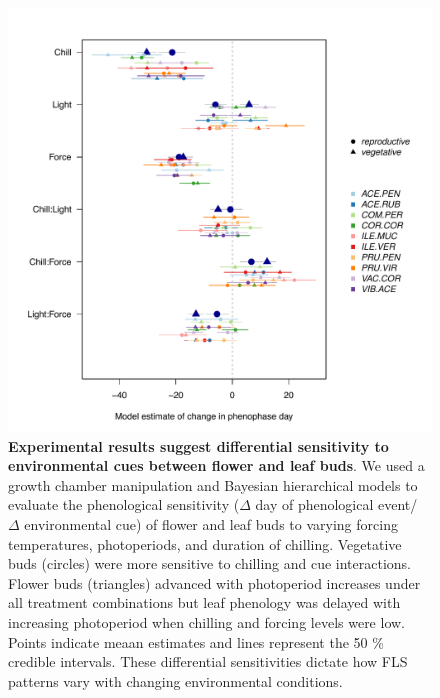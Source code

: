 \documentclass[11pt]{article}
\begin{document}
\begin{figure}[h!]
    \centering
         \includegraphics[width=\textwidth]{..//Plots/Flobuds_manuscript_figs/budburstvsflowering.pdf}
    \caption{\textbf{Experimental results suggest differential sensitivity to environmental cues between flower and leaf buds}. We used a growth chamber manipulation and Bayesian hierarchical models to evaluate the phenological sensitivity ($\Delta$ day of phenological event/ $\Delta$ environmental cue) of flower and leaf buds to varying forcing temperatures, photoperiods, and duration of chilling.   Vegetative buds (circles) were more sensitive to chilling and cue interactions. Flower buds (triangles) advanced with photoperiod increases under all treatment combinations but leaf phenology was delayed with increasing photoperiod when chilling and forcing levels were low. Points indicate meaan estimates and lines represent the 50 \% credible intervals. These differential sensitivities dictate how FLS patterns vary with changing environmental conditions.}
    \label{fig:model}
\end{figure}
\end{document}
